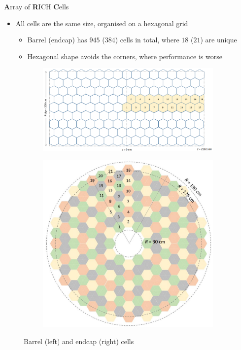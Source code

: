 \documentclass{beamer}
\begin{document}
\begin{frame}{\textbf{A}rray of \textbf{R}ICH \textbf{C}ells}
  \begin{itemize}
    \setlength\itemsep{0.5em}
    \item{All cells are the same size, organised on a hexagonal grid}
    \begin{itemize}
      \item{Barrel (endcap) has $945$ ($384$) cells in total, where $18$ ($21$) are unique}
      \item{Hexagonal shape avoids the corners, where performance is worse}
    \end{itemize}
  \end{itemize}
  \begin{figure}
    \centering
    \begin{subfigure}{0.6\textwidth}
      \includegraphics[width = 1.0\textwidth]{Plots/BarrelCells.png}
    \end{subfigure}%
    \begin{subfigure}{0.3\textwidth}
      \includegraphics[width = 1.0\textwidth]{Plots/EndcapCells.png}
    \end{subfigure}
    \caption{Barrel (left) and endcap (right) cells}
  \end{figure}
\end{frame}
\end{document}
